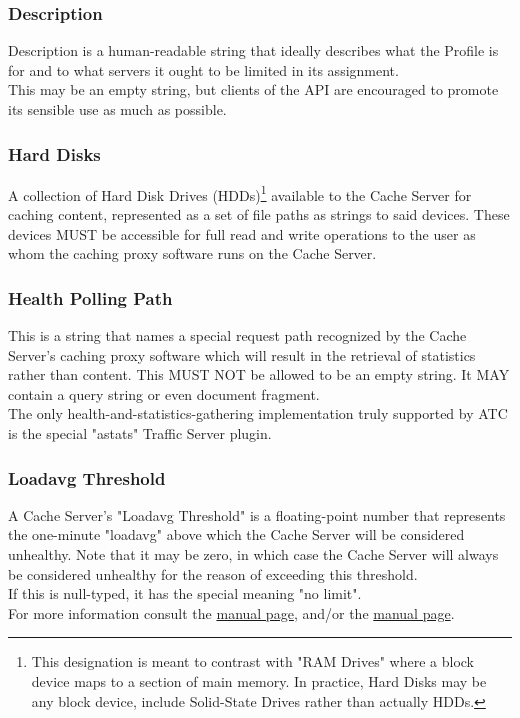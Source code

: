 \subsubsection{Description}
Description is a human-readable string that ideally describes what the Profile
is for and to what servers it ought to be limited in its assignment.\\
This may be an empty string, but clients of the API are encouraged to promote
its sensible use as much as possible.

\subsubsection{Hard Disks}
A collection of Hard Disk Drives (HDDs)\footnote{This designation is meant to
contrast with "RAM Drives" where a block device maps to a section of main
memory. In practice, Hard Disks may be any block device, include Solid-State
Drives rather than actually HDDs.} available to the Cache Server for caching
content, represented as a set of file paths as strings to said devices. These
devices MUST be accessible for full read and write operations to the user as
whom the caching proxy software runs on the Cache Server.

\subsubsection{Health Polling Path}
This is a string that names a special request path recognized by the Cache
Server's caching proxy software which will result in the retrieval of statistics
rather than content. This MUST NOT be allowed to be an empty string. It MAY
contain a query string or even document fragment.\\
The only health-and-statistics-gathering implementation truly supported by ATC
is the special "astats" Traffic Server plugin.

\subsubsection{Loadavg Threshold}
A Cache Server's "Loadavg Threshold" is a floating-point number that represents
the one-minute "loadavg" above which the Cache Server will be considered
unhealthy. Note that it may be zero, in which case the Cache Server will always
be considered unhealthy for the reason of exceeding this threshold.\\
If this is null-typed, it has the special meaning "no limit".\\
For more information consult the
\href{https://linux.die.net/man/3/getloadavg}{ manual page},
and/or the
\href{https://linux.die.net/man/5/proc}{ manual page}.

